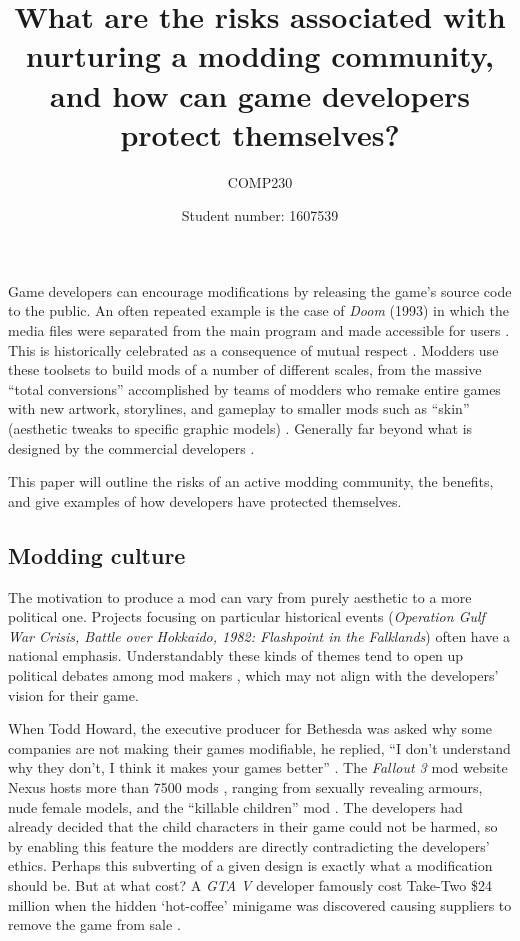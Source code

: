 \documentclass{scrartcl}
\title{What are the risks associated with nurturing a modding community, and how can game developers protect themselves?}
\subtitle{COMP230}
\author{Student number: 1607539}
\begin{document}
\maketitle

Game developers can encourage modifications by releasing the game's source code to the public. An often repeated example is the case of \textit{Doom} (1993) in which the media files were separated from the main program and made accessible for users \cite{sotamaa2010game}. This is historically celebrated as a consequence of mutual respect \cite{hong2013game}. Modders use these toolsets to build mods of a number of different scales, from the massive ``total conversions'' accomplished by teams of modders who remake entire games with new artwork, storylines, and gameplay to smaller mods such as ``skin'' (aesthetic tweaks to specific graphic models) \cite{hong2014becoming}.  Generally far beyond what is designed by the commercial developers \cite{postigo2007mods}.

This paper will outline the risks of an active modding community, the benefits, and give examples of how developers have protected themselves.

\subsection*{Modding culture}

The motivation to produce a mod can vary from purely aesthetic to a more political one. Projects focusing on particular historical events (\textit{Operation Gulf War Crisis, Battle over Hokkaido, 1982: Flashpoint in the Falklands}) often have a national emphasis. Understandably these kinds of themes tend to open up political debates among mod makers \cite{sotamaa2010game}, which may not align with the developers' vision for their game.

When Todd Howard, the executive producer for Bethesda was asked why some companies are not making their games modifiable, he replied, ``I don't understand why they don't, I think it makes your games better'' \cite{todd2012}. The \textit{Fallout 3} mod website Nexus hosts more than 7500 mods \cite{bostan2010explorations}, ranging from sexually revealing armours, nude female models, and the ``killable children'' mod \cite{bostan2010explorations}. The developers had already decided that the child characters in their game could not be harmed, so by enabling this feature the modders are directly contradicting the developers' ethics. Perhaps this subverting of a given design is exactly what a modification should be. But at what cost? A \textit{GTA V} developer famously cost Take-Two {\$}24 million when the hidden `hot-coffee' minigame was discovered causing suppliers to remove the game from sale \cite{hotcoffee1}.
\end{document}
